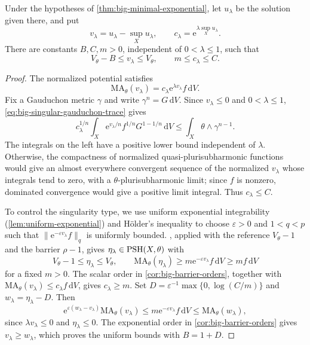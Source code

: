 \begin{lemma}\label{lem:big-exponential-uniform-type}
Under the hypotheses of \cref{thm:big-minimal-exponential}, let $u_\lambda$ be the solution given there, and put
\[
 v_\lambda=u_\lambda-\sup_Xu_\lambda,
 \qquad c_\lambda=\mathrm{e}^{\lambda\sup_Xu_\lambda}.
\]
There are constants $B,C,m>0$, independent of $0<\lambda\leq1$, such that
\begin{equation}\label{eq:big-normalized-uniform-type}
 V_\theta-B\leq v_\lambda\leq V_\theta,
 \qquad m\leq c_\lambda\leq C.
\end{equation}
\end{lemma}
\begin{proof}
The normalized potential satisfies
\[
 \mathrm{MA}_\theta(v_\lambda)=c_\lambda\mathrm{e}^{\lambda v_\lambda}
                         f\,\mathrm{d}V.
\]
Fix a Gauduchon metric $\gamma$ and write $\gamma^n=G\,\mathrm{d}V$. Since $v_\lambda\leq0$ and $0<\lambda\leq1$, \eqref{eq:big-singular-gauduchon-trace} gives
\[
 c_\lambda^{1/n}
 \int_X\mathrm{e}^{v_\lambda/n}f^{1/n}G^{1-1/n}\,\mathrm{d}V
 \leq\int_X\theta\wedge\gamma^{n-1}.
\]
The integrals on the left have a positive lower bound independent of $\lambda$. Otherwise, the compactness of normalized quasi-plurisubharmonic functions would give an almost everywhere convergent sequence of the normalized $v_\lambda$ whose integrals tend to zero, with a $\theta$-plurisubharmonic limit; since $f$ is nonzero, dominated convergence would give a positive limit integral. Thus $c_\lambda\leq C$.

To control the singularity type, we use uniform exponential integrability (\cref{lem:uniform-exponential}) and H\"older's inequality to choose $\varepsilon>0$ and $1<q<p$ such that $\|\mathrm{e}^{-\varepsilon v_\lambda}f\|_q$ is uniformly bounded. , applied with the reference $V_\theta-1$ and the barrier $\rho-1$, gives $\eta_\lambda\in\mathrm{PSH}(X,\theta)$ with
\[
 V_\theta-1\leq\eta_\lambda\leq V_\theta,
 \qquad \mathrm{MA}_\theta(\eta_\lambda)\geq
 m\mathrm{e}^{-\varepsilon v_\lambda}f\,\mathrm{d}V
 \geq mf\,\mathrm{d}V
\]
for a fixed $m>0$. The scalar order in \cref{cor:big-barrier-orders}, together with $\mathrm{MA}_\theta(v_\lambda)\leq c_\lambda f\,\mathrm{d}V$, gives $c_\lambda\geq m$. Set $D=\varepsilon^{-1}\max\{0,\log(C/m)\}$ and $w_\lambda=\eta_\lambda-D$. Then
\[
 \mathrm{e}^{\varepsilon(w_\lambda-v_\lambda)}\mathrm{MA}_\theta(v_\lambda)
 \leq m\mathrm{e}^{-\varepsilon v_\lambda}f\,\mathrm{d}V
 \leq\mathrm{MA}_\theta(w_\lambda),
\]
since $\lambda v_\lambda\leq0$ and $\eta_\lambda\leq0$. The exponential order in \cref{cor:big-barrier-orders} gives $v_\lambda\geq w_\lambda$, which proves the uniform bounds with $B=1+D$.
\end{proof}

